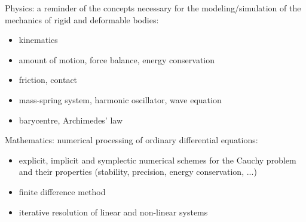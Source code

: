 Physics: a reminder of the concepts necessary for the modeling/simulation of the mechanics of rigid and deformable bodies:
\begin{itemize}
    \item kinematics
    \item amount of motion, force balance, energy conservation
    \item friction, contact
    \item mass-spring system, harmonic oscillator, wave equation
    \item barycentre, Archimedes' law
\end{itemize}
Mathematics: numerical processing of ordinary differential equations:
\begin{itemize}
    \item explicit, implicit and symplectic numerical schemes for the Cauchy problem and their properties (stability, precision, energy conservation, ...)
    \item finite difference method
    \item iterative resolution of linear and non-linear systems
\end{itemize}